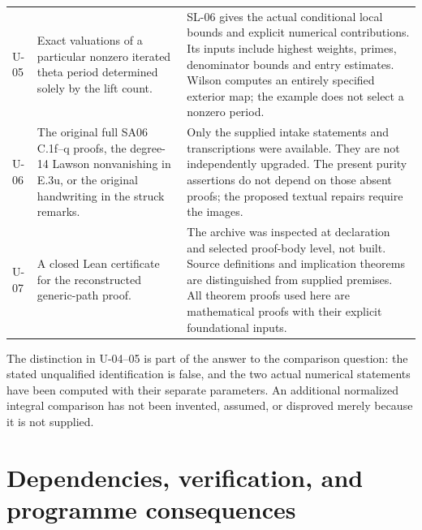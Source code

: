 \documentclass[11pt,a4paper]{article}
\theoremstyle{remark}
\begin{document}
\begin{longtable}{@{}p{}p{}p{}@{}}
U-05 & Exact valuations of a particular nonzero iterated theta period determined solely by the lift count. & SL-06 gives the actual conditional local bounds and explicit numerical contributions. Its inputs include highest weights, primes, denominator bounds and entry estimates. Wilson computes an entirely specified exterior map; the example does not select a nonzero period.\\
U-06 & The original full SA06 C.1f--q proofs, the degree-14 Lawson nonvanishing in E.3u, or the original handwriting in the struck remarks. & Only the supplied intake statements and transcriptions were available. They are not independently upgraded. The present purity assertions do not depend on those absent proofs; the proposed textual repairs require the images.\\
U-07 & A closed Lean certificate for the reconstructed generic-path proof. & The archive was inspected at declaration and selected proof-body level, not built. Source definitions and implication theorems are distinguished from supplied premises. All theorem proofs used here are mathematical proofs with their explicit foundational inputs.\\
\bottomrule
\end{longtable}

The distinction in U-04--05 is part of the answer to the comparison
question: the stated unqualified identification is false, and the two
actual numerical statements have been computed with their separate
parameters.  An additional normalized integral comparison has not been
invented, assumed, or disproved merely because it is not supplied.

\section{Dependencies, verification, and programme consequences}
\end{document}
